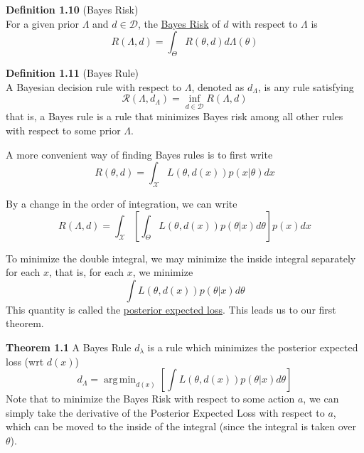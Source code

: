 \documentclass[12pt]{article}
\DeclareMathOperator*{\argmin}{arg\,min}
\numberwithin{equation}{section}
\begin{document}
\textbf{Definition 1.10} (Bayes Risk) \\
For a given prior $\Lambda$ and $d \in \mathcal{D}$, the \underline{Bayes Risk} of $d$ with respect to $\Lambda$ is
\begin{equation*}
  R(\Lambda, d) = \int_{\Theta} R(\theta, d) d \Lambda(\theta)
\end{equation*}

\textbf{Definition 1.11} (Bayes Rule) \\
A Bayesian decision rule with respect to $\Lambda$, denoted as $d_{\Lambda}$, is any rule satisfying
\begin{equation*}
  \mathcal{R}(\Lambda, d_{\Lambda}) = 
    \inf_{d \in \mathcal{D}} R(\Lambda, d)
\end{equation*}
that is, a Bayes rule is a rule that minimizes Bayes risk among all other rules with respect to some prior $\Lambda$.

A more convenient way of finding Bayes rules is to first write
\begin{equation*}
  R(\theta, d) = \int_{\mathcal{X}} L(\theta, d(x)) p(x | \theta) dx
\end{equation*}

By a change in the order of integration, we can write
\begin{equation*}
  R(\Lambda, d) = \int_{\mathcal{X}} \left[
   \int_{\Theta} L(\theta, d(x)) p(\theta | x) d\theta
   \right] p(x) dx
\end{equation*}

To minimize the double integral, we may minimize the inside integral separately for each $x$, that is, for each $x$, we minimize
\begin{equation*}
  \int L(\theta, d(x)) p(\theta | x) d\theta
\end{equation*}
This quantity is called the \underline{posterior expected loss}. This leads us to our first theorem.

\textbf{Theorem 1.1} A Bayes Rule $d_{\lambda}$ is a rule which minimizes the posterior expected loss (wrt $d(x)$)
\begin{equation*}
  d_{\Lambda} = \argmin_{d(x)} \left[
  \int L(\theta, d(x)) p(\theta | x) d\theta
  \right]
\end{equation*}
Note that to minimize the Bayes Risk with respect to some action $a$, we can simply take the derivative of the Posterior Expected Loss with respect to $a$, which can be moved to the inside of the integral (since the integral is taken over $\theta$).
\end{document}
